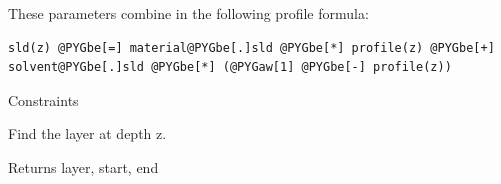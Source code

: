 \documentclass[letterpaper,10pt,english]{sphinxmanual}
\begin{document}
\begin{fulllineitems}
These parameters combine in the following profile formula:

\begin{Verbatim}[commandchars=@\[\]]
sld(z) @PYGbe[=] material@PYGbe[.]sld @PYGbe[*] profile(z) @PYGbe[+] solvent@PYGbe[.]sld @PYGbe[*] (@PYGaw[1] @PYGbe[-] profile(z))
\end{Verbatim}

\begin{fulllineitems}
\label{api/cheby:refl1d.cheby.ChebyVF.constraints}
Constraints

\end{fulllineitems}


\begin{fulllineitems}
\label{api/cheby:refl1d.cheby.ChebyVF.find}
Find the layer at depth z.

Returns layer, start, end

\end{fulllineitems}


\begin{fulllineitems}
\label{api/cheby:refl1d.cheby.ChebyVF.parameters}
\end{fulllineitems}


\begin{fulllineitems}
\label{api/cheby:refl1d.cheby.ChebyVF.render}
\end{fulllineitems}


\end{fulllineitems}

\end{document}
